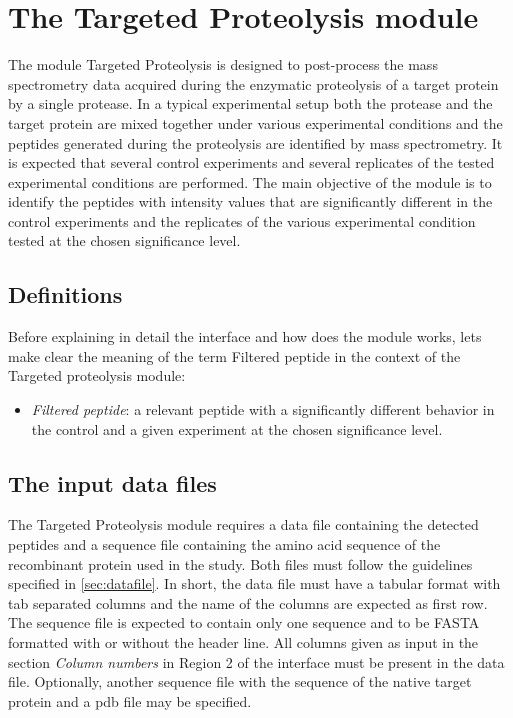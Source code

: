 \chapter{The Targeted Proteolysis module}
\label{chap:enzdig}

The module Targeted Proteolysis is designed to post-process the mass spectrometry data acquired during the enzymatic proteolysis of a target protein by a single protease. In a typical experimental setup both the protease and the target protein are mixed together under various experimental conditions and the peptides generated during the proteolysis are identified by mass spectrometry. It is expected that several control experiments and several replicates of the tested experimental conditions are performed. The main objective of the module is to identify the peptides with intensity values that are significantly different in the control experiments and the replicates of the various experimental condition tested at the chosen significance level. 

\section{Definitions}

Before explaining in detail the interface and how does the module works, lets make clear the meaning of the term Filtered peptide in the context of the Targeted proteolysis module:

\begin{itemize}
	\item \textit{Filtered peptide}: a relevant peptide with a significantly different behavior in the control and a given experiment at the chosen significance level.\label{par:PIP}
\end{itemize}

\section{The input data files}

The Targeted Proteolysis module requires a data file containing the detected peptides and a sequence file containing the amino acid sequence of the recombinant protein used in the study. Both files must follow the guidelines specified in \autoref{sec:datafile}. In short, the data file must have a tabular format with tab separated columns and the name of the columns are expected as first row. The sequence file is expected to contain only one sequence and to be FASTA formatted with or without the header line. All columns given as input in the section \textit{Column numbers} in Region \num{2} of the interface must be present in the data file. Optionally, another sequence file with the sequence of the native target protein and a pdb file may be specified.

